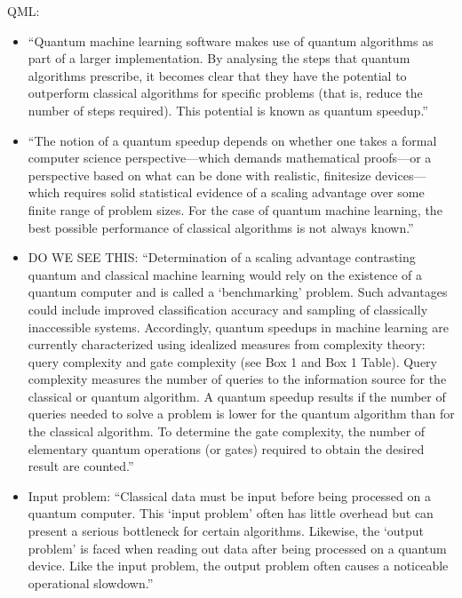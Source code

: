 \documentclass[journal=jacsat,manuscript=article]{achemso}
\begin{document}
\cite{krenn_artificial_2023}






QML\cite{biamonte_quantum_2017}:
\begin{itemize}
	\item ``Quantum machine learning software makes use of quantum algorithms as part of a larger implementation. By analysing the steps that quantum algorithms prescribe, it becomes clear that they have the potential to outperform classical algorithms for specific problems (that is, reduce the number of steps required). This potential is known as quantum speedup.''
	\item ``The notion of a quantum speedup depends on whether one takes a formal computer science perspective—which demands mathematical proofs—or a perspective based on what can be done with realistic, finitesize devices—which requires solid statistical evidence of a scaling advantage over some finite range of problem sizes. For the case of quantum machine learning, the best possible performance of classical algorithms is not always known.''
	\item DO WE SEE THIS: ``Determination of a scaling advantage contrasting quantum and classical machine learning would rely on the existence of a quantum computer and is called a ‘benchmarking’ problem. Such advantages could include improved classification accuracy and sampling of classically inaccessible systems. Accordingly, quantum speedups in machine learning are currently characterized using idealized measures from complexity theory: query complexity and gate complexity (see Box 1 and Box 1 Table). Query complexity measures the number of queries to the information source for the classical or quantum algorithm. A quantum speedup results if the number of queries needed to solve a problem is lower for the quantum algorithm than for the classical algorithm. To determine the gate complexity, the number of elementary quantum operations (or gates) required to obtain the desired result are counted.''
	\item Input problem: ``Classical data must be input before being processed on a quantum computer. This ‘input problem’ often has little overhead but can present a serious bottleneck for certain algorithms. Likewise, the ‘output problem’ is faced when reading out data after being processed on a quantum device. Like the input problem, the output problem often causes a noticeable operational slowdown.''

\end{itemize}
\end{document}
